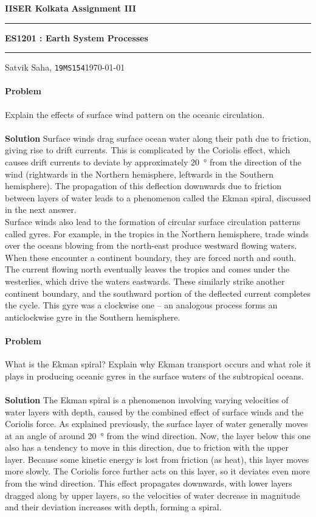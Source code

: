 \documentclass[10pt]{article}
\newcounter{prob}
\def\problem{\stepcounter{prob}\paragraph{Problem \arabic{prob}}}
\def\solution{\\\\\textbf{Solution }}
\begin{document}
        \par\textbf{IISER Kolkata} \hfill \textbf{Assignment III}
        \vspace{3pt}
        \hrule
        \vspace{3pt}
        \begin{center}
                \LARGE{\textbf{ES1201 : Earth System Processes}}
        \end{center}
        \vspace{3pt}
        \hrule
        \vspace{3pt}
        Satvik Saha, \texttt{19MS154}\hfill\today
        \vspace{20pt}

        \problem Explain the effects of surface wind pattern on the oceanic circulation.
        \solution Surface winds drag surface ocean water along their path due to friction, giving rise to drift currents. This is complicated by the 
        Coriolis effect, which causes drift currents to deviate by approximately \SI{20}{\degree} from the direction of the wind (rightwards in the
        Northern hemisphere, leftwards in the Southern hemisphere). The propagation of this deflection downwards due to friction between layers of
        water leads to a phenomenon called the Ekman spiral, discussed in the next answer. \\

        Surface winds also lead to the formation of circular surface circulation patterns called gyres. For example, in the tropics in the Northern
        hemisphere, trade winds over the oceans blowing from the north-east produce westward flowing waters. When these encounter a continent boundary,
        they are forced north and south. The current flowing north eventually leaves the tropics and comes under the westerlies, which drive the
        waters eastwards. These similarly strike another continent boundary, and the southward portion of the deflected current completes the cycle.
        This gyre was a clockwise one -- an analogous process forms an anticlockwise gyre in the Southern hemisphere.


        \problem What is the Ekman spiral?
        Explain why Ekman transport occurs and what role it plays in producing oceanic gyres in the surface waters of the subtropical oceans.
        \solution The Ekman spiral is a phenomenon involving varying velocities of water layers with depth, caused by the combined effect of 
        surface winds and the Coriolis force. As explained previously, the surface layer of water generally moves at an angle of around
        \SI{20}{\degree} from the wind direction. Now, the layer below this one also has a tendency to move in this direction, due
        to friction with the upper layer. Because some kinetic energy is lost from friction (as heat), this layer moves more slowly.
        The Coriolis force further acts on this layer, so it deviates even more from the wind direction. This effect propagates
        downwards, with lower layers dragged along by upper layers, so the velocities of water decrease in magnitude and their deviation
        increases with depth, forming a spiral. \\
\end{document}

